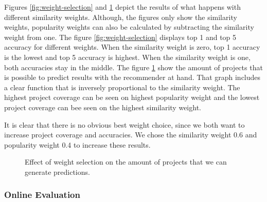 Figures \ref{fig:weight-selection} and \ref{fig:weight-selection-coverage}  depict the results of what happens with different similarity weights. Although, the figures only show the similarity weights, popularity weights can also be calculated by subtracting the similarity weight from one. The figure \ref{fig:weight-selection} displays top 1 and top 5 accuracy for different weights. When the similarity weight is zero, top 1 accuracy is the lowest and top 5 accuracy is highest. When the similarity weight is one, both accuracies stay in the middle. The figure \ref{fig:weight-selection-coverage} show the amount of projects that is possible to predict results with the recommender at hand. That graph includes a clear function that is inversely proportional to the similarity weight. The highest project coverage can be seen on highest popularity weight and the lowest project coverage can bee seen on the highest similarity weight.

It is clear that there is no obvious best weight choice, since we both want to increase project coverage and accuracies. We chose the similarity weight 0.6 and popularity weight 0.4 to increase these results.

\begin{figure}[htpb]
	\centering
	
	\exampleA
	\caption[Coverage figure]{Effect of weight selection on the amount of projects that we can generate predictions.}\label{fig:weight-selection-coverage}
\end{figure}



\subsubsection{Online Evaluation}


